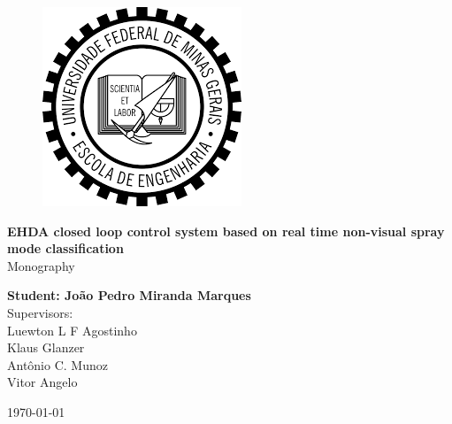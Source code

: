 \begin{titlepage}
    \begin{center}
           
    \vspace{2cm}
    \begin{figure}[h]
        \centering
        \includegraphics[scale=0.5]{Figuras/brasao_ufmg.png}
    \end{figure}
    \vspace{2cm}

    {\bf\Large EHDA closed loop control system based on real time non-visual spray mode classification\\}
    \vspace{2cm} 
    {\Large Monography}
    \vspace{2cm}  
    
    {\bf\large Student: João Pedro Miranda Marques}\\
    \vspace{2cm}
    {\large Supervisors:\\ Luewton L F Agostinho\\
            Klaus Glanzer \\
            Antônio C. Munoz\\
            Vitor Angelo}
    \vspace{2cm}  

    \today
    \vspace{2cm}  
       

    \large \date{\today}
    \end{center}
    
    \end{titlepage}

    \newpage
\clearpage
\thispagestyle{empty}


